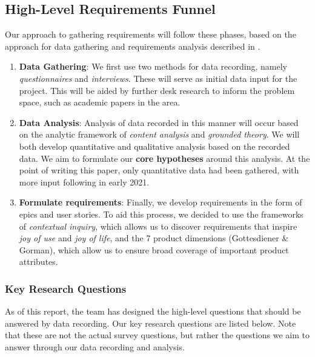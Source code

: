 \subsection{High-Level Requirements Funnel}

Our approach to gathering requirements will follow these phases, based on the approach for data gathering and requirements analysis described in \cite{sharp_2019}.

\begin{enumerate}
    \item \textbf{Data Gathering}: We first use two methods for data recording, namely \textit{questionnaires} and \textit{interviews}. These will serve as initial data input for the project. This will be aided by further desk research to inform the problem space, such as academic papers in the area.
    \item \textbf{Data Analysis}: Analysis of data recorded in this manner will occur based on the analytic framework of \textit{content analysis} and \textit{grounded theory}. We will both develop quantitative and qualitative analysis based on the recorded data. We aim to formulate our \textbf{core hypotheses} around this analysis. At the point of writing this paper, only quantitative data had been gathered, with more input following in early 2021.
    \item \textbf{Formulate requirements}: Finally, we develop requirements in the form of epics and user stories. To aid this process, we decided to use the frameworks of \textit{contextual inquiry}, which allows us to discover requirements that inspire \textit{joy of use} and \textit{joy of life}, and the 7 product dimensions (Gottesdiener \& Gorman), which allow us to ensure broad coverage of important product attributes.
\end{enumerate}

\subsubsection{Key Research Questions}
As of this report, the team has designed the high-level questions that should be answered by data recording. Our key research questions are listed below. Note that these are not the actual survey questions, but rather the questions we aim to answer through our data recording and analysis.


